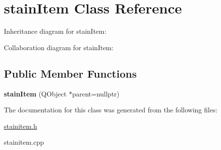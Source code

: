 \hypertarget{classstainItem}{}\section{stain\+Item Class Reference}
\label{classstainItem}


Inheritance diagram for stain\+Item\+:


Collaboration diagram for stain\+Item\+:
\subsection*{Public Member Functions}
\begin{DoxyCompactItemize}
\item 
\mbox{\label{classstainItem_a17b4f70603143ffb98ec0041a5cb42ea}} 
{\bfseries stain\+Item} (Q\+Object $\ast$parent=nullptr)
\end{DoxyCompactItemize}


The documentation for this class was generated from the following files\+:\begin{DoxyCompactItemize}
\item 
\hyperlink{stainitem_8h}{stainitem.\+h}\item 
stainitem.\+cpp\end{DoxyCompactItemize}
